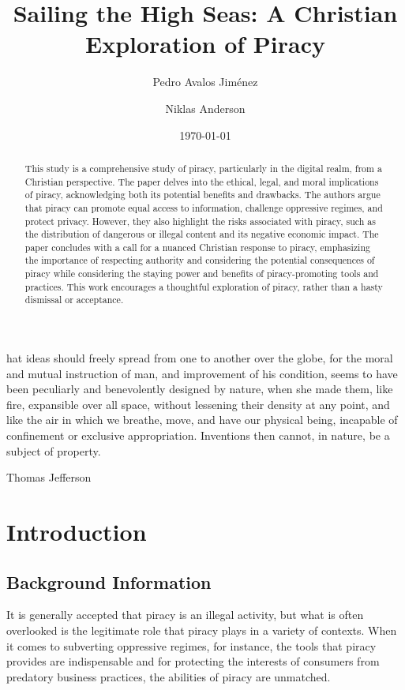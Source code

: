 \documentclass[onecolumn, 12pt]{article}
\title{Sailing the High Seas: A Christian Exploration of Piracy}
\author{Pedro Avalos Jim\'enez}
\author{Niklas Anderson}
\affil{Wheaton College}
\date{\today}
\begin{document}
\begin{refsection}
\maketitle

\epigraph{%
  hat ideas should freely spread from one to another over the globe,
  for the moral and mutual instruction of man, and improvement of his
  condition, seems to have been peculiarly and benevolently designed by nature,
  when she made them, like fire, expansible over all space, without lessening
  their density at any point, and like the air in which we breathe, move, and
  have our physical being, incapable of confinement or exclusive appropriation.
  Inventions then cannot, in nature, be a subject of property.%
}{Thomas Jefferson~\cite{barlow:wine}}

\begin{abstract}
  This study is a comprehensive study of piracy, particularly in the digital
  realm, from a Christian perspective. The paper delves into the ethical, legal,
  and moral implications of piracy, acknowledging both its potential benefits
  and drawbacks. The authors argue that piracy can promote equal access to
  information, challenge oppressive regimes, and protect privacy. However, they
  also highlight the risks associated with piracy, such as the distribution of
  dangerous or illegal content and its negative economic impact. The paper
  concludes with a call for a nuanced Christian response to piracy, emphasizing
  the importance of respecting authority and considering the potential
  consequences of piracy while considering the staying power and benefits of
  piracy-promoting tools and practices. This work encourages a thoughtful
  exploration of piracy, rather than a hasty dismissal or acceptance.
\end{abstract}

\section{Introduction}
\subsection{Background Information}
It is generally accepted that piracy is an illegal activity, but what is often overlooked
is the legitimate role that piracy plays in a variety of contexts. When it comes to
subverting oppressive regimes, for instance, the tools that piracy provides are
indispensable and for protecting the interests of consumers from predatory business
practices, the abilities of piracy are unmatched.


\end{refsection}
\end{document}
